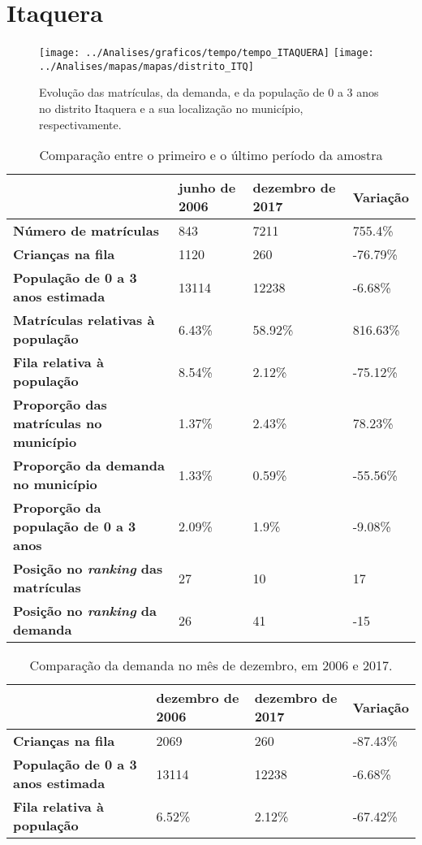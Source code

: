 \section{Itaquera}
\begin{figure}[H]
\centering
\texttt{[image: ../Analises/graficos/tempo/tempo\_ITAQUERA]}
\texttt{[image: ../Analises/mapas/mapas/distrito\_ITQ]}
\caption{Evolução das matrículas, da demanda, e da população de 0 a 3 anos no distrito Itaquera e a sua localização no município, respectivamente.}
\end{figure}
\begin{table}[H]
\begin{tabular}{l|l|l|l}
\textbf{}                                      & \textbf{junho de 2006}       & \textbf{dezembro de 2017}    & \textbf{Variação} \\ \hline
\textbf{Número de matrículas}                  & 843 & 7211 & 755.4\% \\ \hline
\textbf{Crianças na fila}                      & 1120 & 260 & -76.79\% \\ \hline
\textbf{População de 0 a 3 anos estimada}      & 13114 & 12238 & -6.68\% \\ \hline
\textbf{Matrículas relativas à população}      & 6.43\% & 58.92\% & 816.63\% \\ \hline
\textbf{Fila relativa à população}             & 8.54\% & 2.12\% & -75.12\% \\ \hline
\textbf{Proporção das matrículas no município} & 1.37\% & 2.43\% & 78.23\% \\ \hline
\textbf{Proporção da demanda no município}     & 1.33\% & 0.59\% & -55.56\% \\ \hline
\textbf{Proporção da população de 0 a 3 anos}  & 2.09\% & 1.9\% & -9.08\% \\ \hline
\textbf{Posição no \textit{ranking} das matrículas}     & 27 & 10 & 17 \\ \hline
\textbf{Posição no \textit{ranking} da demanda}         & 26 & 41 & -15 \\ 
\end{tabular}
\caption{Comparação entre o primeiro e o último período da amostra}
\end{table}
\begin{table}[H]
\begin{tabular}{l|l|l|l}
\textbf{}                                 & \textbf{dezembro de 2006} & \textbf{dezembro de 2017} & \textbf{Variação} \\ \hline
\textbf{Crianças na fila}                      & 2069 & 260 & -87.43\% \\ \hline
\textbf{População de 0 a 3 anos estimada}      & 13114 & 12238 & -6.68\% \\ \hline
\textbf{Fila relativa à população}             & 6.52\% & 2.12\% & -67.42\% \\
\end{tabular}
\caption{Comparação da demanda no mês de dezembro, em 2006 e 2017.}
\end{table}
